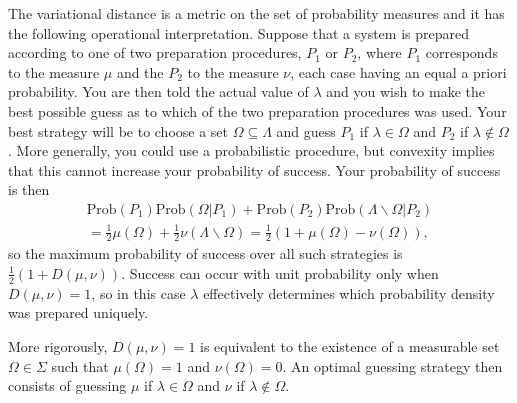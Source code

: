 \documentclass[DIV=calc,fontsize=12pt]{scrartcl} %
\theoremstyle{definition}
\theoremstyle{plain}
\begin{document}
\begin{figure}[p!]
\caption{}
\end{figure}

The variational distance is a metric on the set of probability
measures and it has the following operational interpretation.  Suppose
that a system is prepared according to one of two preparation
procedures, $P_1$ or $P_2$, where $P_1$ corresponds to the measure
$\mu$ and the $P_2$ to the measure $\nu$, each case having an equal a
priori probability.  You are then told the actual value of $\lambda$
and you wish to make the best possible guess as to which of the two
preparation procedures was used.  Your best strategy will be to choose
a set $\Omega \subseteq \Lambda$ and guess $P_1$ if $\lambda \in
\Omega$ and $P_2$ if $\lambda \notin \Omega$.  More generally, you
could use a probabilistic procedure, but convexity implies that this
cannot increase your probability of success.  Your probability of
success is then
\begin{multline}
\text{Prob}(P_1)\text{Prob}(\Omega|P_1) + \text{Prob}(P_2)
\text{Prob}(\Lambda \backslash \Omega|P_2)\\
=\frac{1}{2}\mu(\Omega) + \frac{1}{2}\nu(\Lambda \backslash \Omega)
=\frac{1}{2} \left ( 1 + \mu(\Omega) - \nu(\Omega) \right ),
\end{multline}
so the maximum probability of success over all such strategies is
$\frac{1}{2} \left ( 1 + D(\mu,\nu) \right )$.  Success can occur with
unit probability only when $D(\mu,\nu) = 1$, so in this case $\lambda$
effectively determines which probability density was prepared
uniquely.

More rigorously, $D(\mu,\nu) = 1$ is equivalent to the existence of a
measurable set $\Omega \in \Sigma$ such that $\mu(\Omega) = 1$ and
$\nu(\Omega) = 0$.  An optimal guessing strategy then consists of
guessing $\mu$ if $\lambda \in \Omega$ and $\nu$ if $\lambda \notin
\Omega$.
\end{document}
